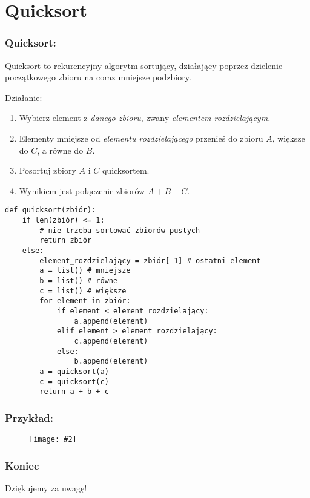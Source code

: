 \documentclass{beamer}
\newcommand{\obrazek}[2]{
        \begin{figure}[h]
            \centering
            \texttt{[image: \#2]}
        \end{figure}
    }
\begin{document}
\section{Quicksort}
\begin{frame}
    \frametitle{Quicksort:}
    Quicksort to rekurencyjny algorytm sortujący, działający poprzez dzielenie początkowego zbioru na coraz mniejsze podzbiory.
    \vspace{5mm}

    Działanie:
    \begin{enumerate}
        \item Wybierz element z \emph{danego zbioru}, zwany \emph{elementem rozdzielającym.}
        \item Elementy mniejsze od \emph{elementu rozdzielającego} przenieś do zbioru $A$, większe do $C$, a równe do $B$.
        \item Posortuj zbiory $A$ i $C$ quicksortem.
        \item Wynikiem jest połączenie zbiorów $A + B + C$.
    \end{enumerate}
\end{frame}

\begin{verbatim}
def quicksort(zbiór):
    if len(zbiór) <= 1:
        # nie trzeba sortować zbiorów pustych 
        return zbiór
    else:
        element_rozdzielający = zbiór[-1] # ostatni element
        a = list() # mniejsze
        b = list() # równe
        c = list() # większe
        for element in zbiór:
            if element < element_rozdzielający:
                a.append(element)
            elif element > element_rozdzielający:
                c.append(element)
            else:
                b.append(element)
        a = quicksort(a)
        c = quicksort(c)
        return a + b + c
\end{verbatim}

\begin{frame}
    \frametitle{Przykład:}
    \obrazek{.5}{quicksortExample.png}
\end{frame}

\begin{frame}
    \frametitle{Koniec}
    \begin{center}
        Dziękujemy za uwagę!
    \end{center}
\end{frame}
\end{document}
